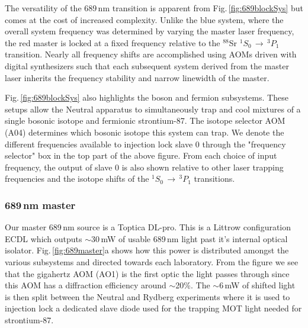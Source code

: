 The versatility of the 689\,nm transition is apparent from Fig.\,\ref{fig:689blockSys} but comes at the cost of increased complexity.
Unlike the blue system, where the overall system frequency was determined by varying the master laser frequency, the red master is locked at a fixed frequency relative to the $^{88}$Sr $^1S_0\,\rightarrow\,^3P_1$ transition.
Nearly all frequency shifts are accomplished using AOMs driven with digital synthesizers such that each subsequent system derived from the master laser inherits the frequency stability and narrow linewidth of the master.

Fig.\,\ref{fig:689blockSys} also highlights the boson and fermion subsystems.
These setups allow the Neutral apparatus to simultaneously trap and cool mixtures of a single bosonic isotope and fermionic strontium-87.
The isotope selector AOM (A04) determines which bosonic isotope this system can trap.
We denote the different frequencies available to injection lock slave 0 through the "frequency selector" box in the top part of the above figure.
From each choice of input frequency, the output of slave 0 is also shown relative to other laser trapping frequencies and the isotope shifts of the $^1S_0\,\rightarrow\,^3P_1$ transitions.




	
\subsubsection{689\,nm master}
Our master 689\,nm source is a Toptica DL-pro.
This is a Littrow configuration ECDL which outputs $\sim$30\,mW of usable 689\,nm light past it's internal optical isolator.
Fig.\,\ref{fig:689master}a shows how this power is distributed amongst the various subsystems and directed towards each laboratory.
From the figure we see that the gigahertz AOM (AO1)  is the first optic the light passes through since this AOM has a diffraction efficiency around $\sim$20\%.
The $\sim$6\,mW of shifted light is then split between the Neutral and Rydberg experiments where it is used to injection lock a dedicated slave diode used for the trapping MOT light needed for strontium-87.

